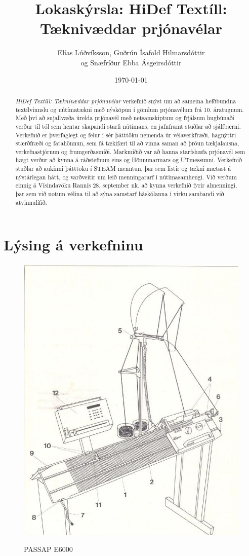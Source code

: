 \documentclass[a4paper,12pt,twoside]{article}
\title{Lokaskýrsla: HiDef Textíll: \\ Tæknivæddar prjónavélar}
\author{Elías Lúðvíksson, Guðrún Ísafold Hilmarsdóttir\\ og Snæfríður Ebba Ásgeirsdóttir}
\date{\today}
\begin{document}
\maketitle
\begin{abstract}
    \emph{HiDef Textíll: Tæknivæddar prjónavélar} verkefnið snýst um að sameina hefðbundna textílvinnslu og nútímatækni með nýsköpun í gömlum prjónavélum frá 10. áratugnum. Með því að snjallvæða úrelda prjónavél með netsamskiptum og frjálsum hugbúnaði verður til tól sem hentar skapandi starfi nútímans, en jafnframt stuðlar að sjálfbærni. Verkefnið er þverfaglegt og felur í sér þátttöku nemenda úr vélaverkfræði, hagnýttri stærðfræði og fatahönnun, sem fá tækifæri til að vinna saman að þróun tækjalausna, verkefnastjórnun og frumgerðasmíði. Markmiðið var að hanna starfshæfa prjónavél sem hægt verður að kynna á ráðstefnum eins og Hönnunarmars og UTmessunni. Verkefnið stuðlar að aukinni þátttöku í STEAM menntun, þar sem listir og tækni mætast á nýstárlegan hátt, og varðveitir um leið menningararf í nútímasamhengi. Við verðum einnig á Vísindavöku Rannís 28. september nk. að kynna verkefnið fyrir almenningi, þar sem við notum vélina til að sýna samstarf háskólanna í virku sambandi við atvinnulífið.
\end{abstract}

\tableofcontents
\newpage

\section{Lýsing á verkefninu}


\begin{figure} 
    \centering \label{img:passap}
    \includegraphics[width=.9\linewidth]{myndir/skema-e6000.png}
    \caption{PASSAP E6000}
\end{figure}
\end{document}
